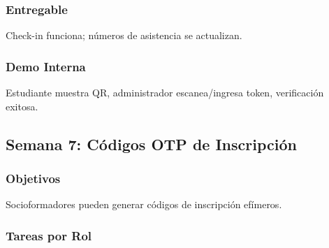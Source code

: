 \documentclass[12pt,a4paper]{article}
\begin{document}
\subsubsection{Entregable}
Check-in funciona; números de asistencia se actualizan.

\subsubsection{Demo Interna}
Estudiante muestra QR, administrador escanea/ingresa token, verificación exitosa.

\subsection{Semana 7: Códigos OTP de Inscripción}

\subsubsection{Objetivos}
Socioformadores pueden generar códigos de inscripción efímeros.

\subsubsection{Tareas por Rol}
\end{document}
